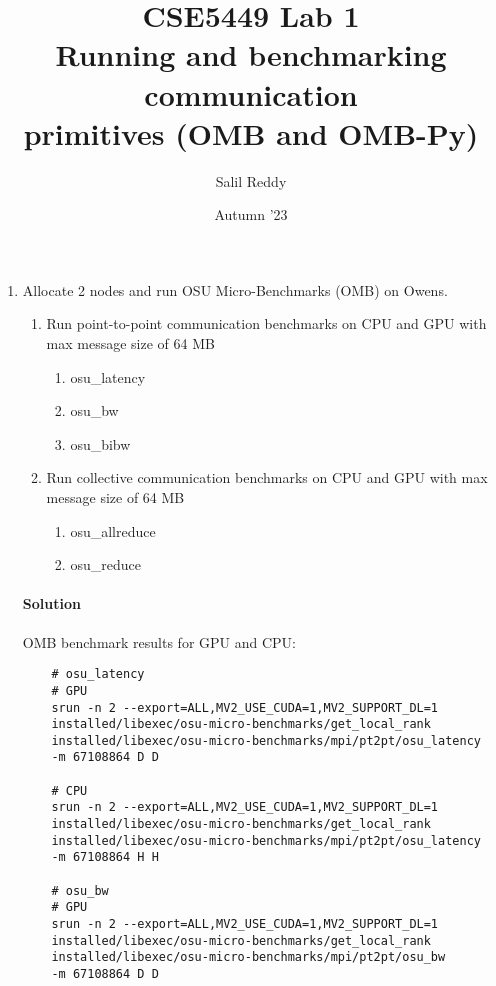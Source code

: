 \documentclass[12pt]{article}
\title{%
    CSE5449 Lab 1 \\
    \large  Running and benchmarking communication \\
    primitives (OMB and OMB-Py)}
\author{Salil Reddy}
\date{Autumn '23}
\begin{document}
\maketitle

\begin{enumerate}
    \item Allocate 2 nodes and run OSU Micro-Benchmarks (OMB) on Owens.
        \begin{enumerate}
            \item Run point-to-point communication benchmarks on CPU and GPU 
                    with max message size of 64 MB 
                \begin{enumerate}
                    \item osu\_latency
                    \item osu\_bw
                    \item osu\_bibw
                \end{enumerate}
            \item Run collective communication benchmarks on CPU and GPU with 
                max message size of 64 MB 
                \begin{enumerate}
                    \item osu\_allreduce
                    \item osu\_reduce
                \end{enumerate}
        \end{enumerate}

    \paragraph[short]{Solution} OMB benchmark results for GPU and CPU:
    
    \begin{verbatim}
    # osu_latency
    # GPU
    srun -n 2 --export=ALL,MV2_USE_CUDA=1,MV2_SUPPORT_DL=1 
    installed/libexec/osu-micro-benchmarks/get_local_rank 
    installed/libexec/osu-micro-benchmarks/mpi/pt2pt/osu_latency 
    -m 67108864 D D

    # CPU
    srun -n 2 --export=ALL,MV2_USE_CUDA=1,MV2_SUPPORT_DL=1 
    installed/libexec/osu-micro-benchmarks/get_local_rank 
    installed/libexec/osu-micro-benchmarks/mpi/pt2pt/osu_latency 
    -m 67108864 H H 

    # osu_bw
    # GPU
    srun -n 2 --export=ALL,MV2_USE_CUDA=1,MV2_SUPPORT_DL=1 
    installed/libexec/osu-micro-benchmarks/get_local_rank 
    installed/libexec/osu-micro-benchmarks/mpi/pt2pt/osu_bw 
    -m 67108864 D D


\end{verbatim}
\end{enumerate}
\end{document}
